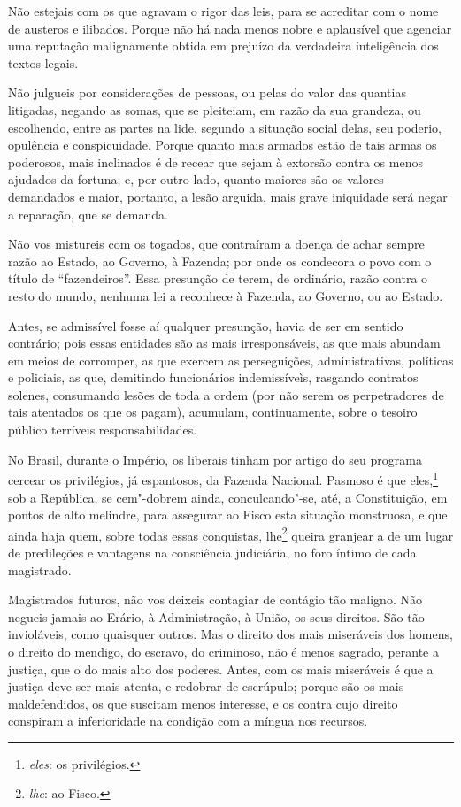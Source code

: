 Não estejais com os que agravam o rigor das leis, para se
acreditar com o nome de austeros e ilibados. Porque não há nada menos
nobre e aplausível que agenciar uma reputação malignamente obtida em
prejuízo da verdadeira inteligência dos textos legais.

Não julgueis por considerações de pessoas, ou pelas do valor das
quantias litigadas, negando as somas, que se pleiteiam, em razão da sua
grandeza, ou escolhendo, entre as partes na lide, segundo a situação
social delas, seu poderio, opulência e conspicuidade. Porque quanto
mais armados estão de tais armas os poderosos, mais inclinados é de
recear que sejam à extorsão contra os menos ajudados da fortuna; e, por
outro lado, quanto maiores são os valores demandados e maior, portanto,
a lesão arguida, mais grave iniquidade será negar a reparação, que se
demanda.

Não vos mistureis com os togados, que contraíram a doença de achar
sempre razão ao Estado, ao Governo, à Fazenda; por onde os condecora o
povo com o título de ``fazendeiros''. Essa
presunção de terem, de ordinário, razão contra o resto do mundo,
nenhuma lei a reconhece à Fazenda, ao Governo, ou ao Estado.

Antes, se admissível fosse aí qualquer presunção, havia de ser em
sentido contrário; pois essas entidades são as mais irresponsáveis, as
que mais abundam em meios de corromper, as que exercem as perseguições,
administrativas, políticas e policiais, as que, demitindo funcionários
indemissíveìs, rasgando contratos solenes, consumando lesões de toda a
ordem (por não serem os perpetradores de tais atentados os que os
pagam), acumulam, continuamente, sobre o tesoiro público terríveis
responsabilidades.

No Brasil, durante o Império, os liberais tinham por artigo do seu
programa cercear os privilégios, já espantosos, da Fazenda Nacional.
Pasmoso é que eles,\footnote{ \textit{eles}: os privilégios.} sob a República, se cem"-dobrem ainda, conculcando"-se,
até, a Constituição, em pontos de alto melindre, para assegurar ao
Fisco esta situação monstruosa, e que ainda haja quem, sobre todas
essas conquistas, lhe\footnote{ \textit{lhe}: ao Fisco.} queira granjear a de um lugar de predileções e vantagens na
consciência judiciária, no foro íntimo de cada magistrado.

Magistrados futuros, não vos deixeis contagiar de contágio tão
maligno. Não negueis jamais ao Erário, à Administração, à União, os
seus direitos. São tão invioláveis, como quaisquer outros. Mas o
direito dos mais miseráveis dos homens, o direito do mendigo, do
escravo, do criminoso, não é menos sagrado, perante a justiça, que o do
mais alto dos poderes. Antes, com os mais miseráveis é que a justiça
deve ser mais atenta, e redobrar de escrúpulo; porque são os mais
maldefendidos,
os que suscitam menos interesse, e os contra cujo direito conspiram a
inferioridade na condição com a míngua nos recursos.

